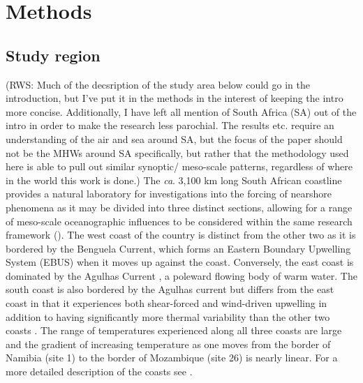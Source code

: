 \documentclass[a4paper,10pt,review]{elsarticle}
\begin{document}
\section{Methods}
\subsection{Study region}
(RWS: Much of the decsription of the study area below could go in the introduction, but I've put it in the methods in the interest of keeping the intro more concise. Additionally, I have left all mention of South Africa (SA) out of the intro in order to make the research less parochial. The results etc. require an understanding of the air and sea around SA, but the focus of the paper should not be the MHWs around SA specifically, but rather that the methodology used here is able to pull out similar synoptic/ meso-scale patterns, regardless of where in the world this work is done.)
The \emph{ca}. 3,100 km long South African coastline provides a natural laboratory for investigations into the forcing of nearshore phenomena as it may be divided into three distinct sections, allowing for a range of meso-scale oceanographic influences to be considered within the same research framework (). The west coast of the country is distinct from the other two as it is bordered by the Benguela Current, which forms an Eastern Boundary Upwelling System (EBUS) \citep{Hutchings2009} when it moves up against the coast. Conversely, the east coast is dominated by the Agulhas Current \citep{Luning1990}, a poleward flowing body of warm water. The south coast is also bordered by the Agulhas current but differs from the east coast in that it experiences both shear-forced and wind-driven upwelling \citep{Lutjeharms2000a} in addition to having significantly more thermal variability than the other two coasts \citep{Schlegel2017}. The range of temperatures experienced along all three coasts are large and the gradient of increasing temperature as one moves from the border of Namibia (site 1) to the border of Mozambique (site 26) is nearly linear. For a more detailed description of the coasts see \citet{Smit2013}.
\end{document}
